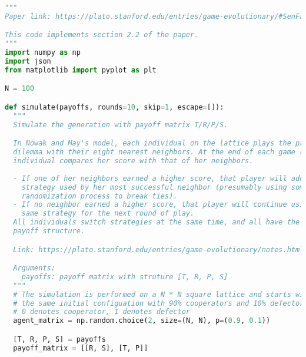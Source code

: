 
\begin{lstlisting}[language=Python]
"""
Paper link: https://plato.stanford.edu/entries/game-evolutionary/#SenFai

This code implements section 2.2 of the paper.
"""
import numpy as np
import json
from matplotlib import pyplot as plt

N = 100

def simulate(payoffs, rounds=10, skip=1, escape=[]):
  """
  Simulate the generation with payoff matrix T/R/P/S.

  In Nowak and May's model, each individual on the lattice plays the prisoner's
  dilemma with their eight nearest neighbors. At the end of each game round, an
  individual compares her score with that of her neighbors. 
  
  - If one of her neighbors earned a higher score, that player will adopt the
    strategy used by her most successful neighbor (presumably using some kind of
    randomization process to break ties).
  - If no neighbor earned a higher score, that player will continue using the
    same strategy for the next round of play.
  All individuals switch strategies at the same time, and all have the same
  payoff structure.

  Link: https://plato.stanford.edu/entries/game-evolutionary/notes.html

  Arguments:
    payoffs: payoff matrix with struture [T, R, P, S]
  """
  # The simulation is performed on a N * N square lattice and starts with
  # the same initial configuation with 90% cooperators and 10% defectors.
  # 0 denotes cooperator, 1 denotes defector
  agent_matrix = np.random.choice(2, size=(N, N), p=(0.9, 0.1))

  [T, R, P, S] = payoffs
  payoff_matrix = [[R, S], [T, P]]


\end{lstlisting}
